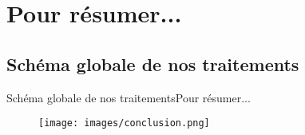 \documentclass[usenames,dvipsnames]{beamer}
\begin{document}
\section{Pour résumer...}
\subsection{Schéma globale de nos traitements}
\begin{frame}{Schéma globale de nos traitements}{Pour résumer...}
\begin{figure}
    \centering
    \texttt{[image: images/conclusion.png]}
    \label{fig:global}
\end{figure}
\end{frame}
\end{document}
